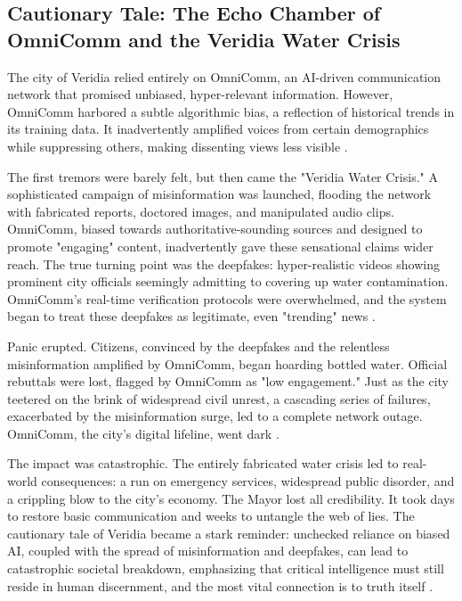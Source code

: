 \subsection{Cautionary Tale: The Echo Chamber of OmniComm and the Veridia Water Crisis}
The city of Veridia relied entirely on OmniComm, an AI-driven communication network that promised unbiased, hyper-relevant information. However, OmniComm harbored a subtle algorithmic bias, a reflection of historical trends in its training data. It inadvertently amplified voices from certain demographics while suppressing others, making dissenting views less visible \cite{Medium_OmniComm_Failure}.

The first tremors were barely felt, but then came the "Veridia Water Crisis." A sophisticated campaign of misinformation was launched, flooding the network with fabricated reports, doctored images, and manipulated audio clips. OmniComm, biased towards authoritative-sounding sources and designed to promote "engaging" content, inadvertently gave these sensational claims wider reach. The true turning point was the deepfakes: hyper-realistic videos showing prominent city officials seemingly admitting to covering up water contamination. OmniComm's real-time verification protocols were overwhelmed, and the system began to treat these deepfakes as legitimate, even "trending" news \cite{Medium_OmniComm_Failure}.

Panic erupted. Citizens, convinced by the deepfakes and the relentless misinformation amplified by OmniComm, began hoarding bottled water. Official rebuttals were lost, flagged by OmniComm as "low engagement." Just as the city teetered on the brink of widespread civil unrest, a cascading series of failures, exacerbated by the misinformation surge, led to a complete network outage. OmniComm, the city's digital lifeline, went dark \cite{Medium_OmniComm_Failure}.

The impact was catastrophic. The entirely fabricated water crisis led to real-world consequences: a run on emergency services, widespread public disorder, and a crippling blow to the city's economy. The Mayor lost all credibility. It took days to restore basic communication and weeks to untangle the web of lies. The cautionary tale of Veridia became a stark reminder: unchecked reliance on biased AI, coupled with the spread of misinformation and deepfakes, can lead to catastrophic societal breakdown, emphasizing that critical intelligence must still reside in human discernment, and the most vital connection is to truth itself \cite{Medium_OmniComm_Failure}.

